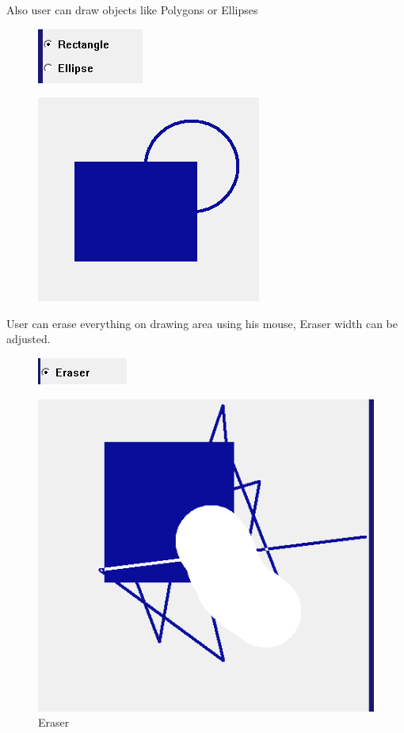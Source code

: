 \documentclass[12pt]{article}
\begin{document}
        Also user can draw objects like Polygons or Ellipses 
        \begin{figure}[H]
                \centering
                \includegraphics[width=.5\textwidth]{img6.png}
             
        \end{figure}
        \begin{figure}[H]
                \centering
                \includegraphics[width=.5\textwidth]{img5.png}
                
        \end{figure}
        \vspace{0.5 cm}
        User can erase everything on drawing area using his mouse, Eraser width can be adjusted. 
        \begin{figure}[H]
                \centering
                \includegraphics[width=.4\textwidth]{img7.png}
             
        \end{figure}
        \begin{figure}[H]
                \centering
                \includegraphics[width=.5\textwidth]{img8.png}
                \caption{Eraser}
        \end{figure}
\end{document}
